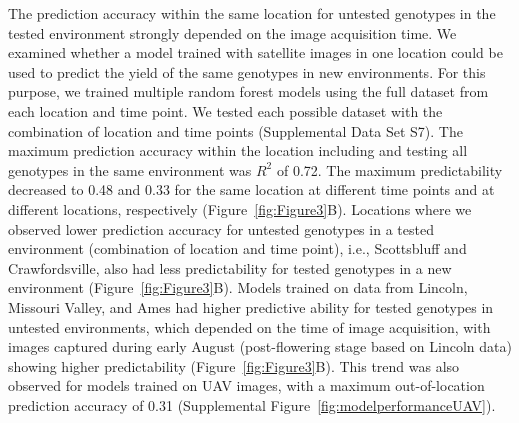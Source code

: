 \documentclass[12pt,twoside]{gsag3jnl}
\begin{document}
The prediction accuracy within the same location for untested genotypes in the tested environment strongly depended on the image acquisition time. We examined whether a model trained with satellite images in one location could be used to predict the yield of the same genotypes in new environments. For this purpose, we trained multiple random forest models using the full dataset from each location and time point. We tested each possible dataset with the combination of location and time points (Supplemental Data Set S7). The maximum prediction accuracy within the location including and testing all genotypes in the same environment was $R^2$ of 0.72. The maximum predictability decreased to 0.48 and 0.33 for the same location at different time points and at different locations, respectively (Figure~\ref{fig:Figure3}B). Locations where we observed lower prediction accuracy for untested genotypes in a tested environment (combination of location and time point), i.e., Scottsbluff and Crawfordsville, also had less predictability for tested genotypes in a new environment (Figure~\ref{fig:Figure3}B). Models trained on data from Lincoln, Missouri Valley, and Ames had higher predictive ability for tested genotypes in untested environments, which depended on the time of image acquisition, with images captured during early August (post-flowering stage based on Lincoln data) showing higher predictability (Figure~\ref{fig:Figure3}B). This trend was also observed for models trained on UAV images, with a maximum out-of-location prediction accuracy of 0.31 (Supplemental Figure~\ref{fig:modelperformanceUAV}). 
\end{document}
